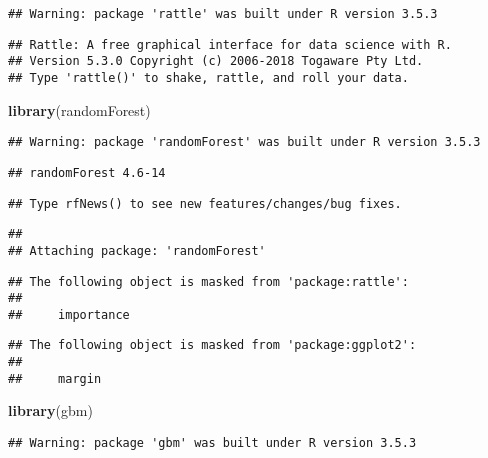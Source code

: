 \documentclass[]{article}
\newenvironment{Shaded}{\begin{snugshade}}{\end{snugshade}}
\newcommand{\KeywordTok}[1]{\textcolor[rgb]{0.13,0.29,0.53}{\textbf{#1}}}
\newcommand{\NormalTok}[1]{#1}
\begin{document}
\begin{verbatim}
## Warning: package 'rattle' was built under R version 3.5.3
\end{verbatim}

\begin{verbatim}
## Rattle: A free graphical interface for data science with R.
## Version 5.3.0 Copyright (c) 2006-2018 Togaware Pty Ltd.
## Type 'rattle()' to shake, rattle, and roll your data.
\end{verbatim}

\begin{Shaded}
\begin{Highlighting}[]
\KeywordTok{library}\NormalTok{(randomForest)}
\end{Highlighting}
\end{Shaded}

\begin{verbatim}
## Warning: package 'randomForest' was built under R version 3.5.3
\end{verbatim}

\begin{verbatim}
## randomForest 4.6-14
\end{verbatim}

\begin{verbatim}
## Type rfNews() to see new features/changes/bug fixes.
\end{verbatim}

\begin{verbatim}
## 
## Attaching package: 'randomForest'
\end{verbatim}

\begin{verbatim}
## The following object is masked from 'package:rattle':
## 
##     importance
\end{verbatim}

\begin{verbatim}
## The following object is masked from 'package:ggplot2':
## 
##     margin
\end{verbatim}

\begin{Shaded}
\begin{Highlighting}[]
\KeywordTok{library}\NormalTok{(gbm)}
\end{Highlighting}
\end{Shaded}

\begin{verbatim}
## Warning: package 'gbm' was built under R version 3.5.3
\end{verbatim}
\end{document}
